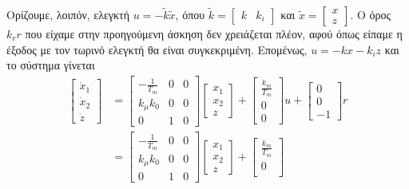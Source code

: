 Ορίζουμε, λοιπόν, ελεγκτή $u=-\tilde{k}\tilde{x}$, όπου $\tilde{k} = \begin{bmatrix} k & k_i \end{bmatrix}$ και $\tilde{x} = \begin{bmatrix} x \\ z \end{bmatrix}$. Ο όρος $k_rr$ που είχαμε στην προηγούμενη άσκηση δεν χρειάζεται πλέον, αφού όπως είπαμε η έξοδος με τον τωρινό ελεγκτή θα είναι συγκεκριμένη. Επομένως, $u=-kx-k_iz$ και το σύστημα γίνεται
\begin{align*}
    \begin{bmatrix} 
        \dot{x}_1 \\ \dot{x}_2 \\ \dot{z} 
    \end{bmatrix} 
    &= 
    \begin{bmatrix}
        -\frac{1}{T_m} & 0 & 0 \\
        k_μk_0 & 0 & 0 \\ 
        0 & 1 & 0 
    \end{bmatrix}
    \begin{bmatrix}
        x_1 \\
        x_2 \\
        z
    \end{bmatrix} + 
    \begin{bmatrix}
        \frac{k_m}{T_m} \\
        0 \\ 
        0
    \end{bmatrix} u + 
    \begin{bmatrix}
        0 \\
        0 \\
        -1
    \end{bmatrix} r \\
    &=
    \begin{bmatrix}
        -\frac{1}{T_m} & 0 & 0 \\
        k_μk_0 & 0 & 0 \\ 
        0 & 1 & 0 
    \end{bmatrix}
    \begin{bmatrix}
        x_1 \\
        x_2 \\
        z
    \end{bmatrix} + 
    \begin{bmatrix}
        \frac{k_m}{T_m} \\
        0 \\ 

\end{bmatrix}
\end{align*}
